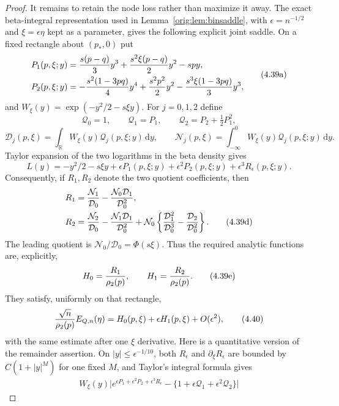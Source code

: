 \documentclass[11pt,a4paper]{article}
\numberwithin{equation}{section}
\theoremstyle{definition}
\theoremstyle{remark}
\newcommand{\dd}{\,\mathrm d}
\begin{document}
\begin{proof}
It remains to retain the node loss rather than maximize it away.  The
exact beta-integral representation used in Lemma~\ref{orig:lem:binsaddle}, with
$\epsilon=n^{-1/2}$ and $\xi=\epsilon\eta$ kept as a parameter, gives the
following explicit joint saddle.  On a fixed rectangle about $(p_*,0)$ put
\[
 \begin{aligned}
 P_1(p,\xi;y)&={s(p-q)\over3}y^3
       +{s^2\xi(p-q)\over2}y^2-spy,\\
 P_2(p,\xi;y)&=-{s^2(1-3pq)\over4}y^4+{s^2p^2\over2}y^2
       -{s^3\xi(1-3pq)\over3}y^3,
 \end{aligned}                                                   \tag{4.39a}
\]
and $W_\xi(y)=\exp(-y^2/2-s\xi y)$.  For $j=0,1,2$ define
\[
 \mathcal Q_0=1,\qquad \mathcal Q_1=P_1,\qquad
 \mathcal Q_2=P_2+\tfrac12P_1^2,
\]
\[
 \mathcal D_j(p,\xi)=\int_{\mathbb R}W_\xi(y)\mathcal Q_j(p,\xi;y)\dd y,
 \qquad
 \mathcal N_j(p,\xi)=\int_{-\infty}^0W_\xi(y)\mathcal Q_j(p,\xi;y)\dd y.  \tag{4.39b}
\]
Taylor expansion of the two logarithms in the beta density gives
\[
 L(y)=-y^2/2-s\xi y+\epsilon P_1(p,\xi;y)
       +\epsilon^2P_2(p,\xi;y)+\epsilon^3R_\epsilon(p,\xi;y).     \tag{4.39c}
\]
Consequently, if $R_1,R_2$ denote the two quotient coefficients, then
\begin{align}
 R_1={}&{\mathcal N_1\over\mathcal D_0}
       -{\mathcal N_0\mathcal D_1\over\mathcal D_0^2},\notag\\
 R_2={}&{\mathcal N_2\over\mathcal D_0}
       -{\mathcal N_1\mathcal D_1\over\mathcal D_0^2}
       +\mathcal N_0\left\{{\mathcal D_1^2\over\mathcal D_0^3}
                    -{\mathcal D_2\over\mathcal D_0^2}\right\}. \tag{4.39d}
\end{align}
The leading quotient is
$\mathcal N_0/\mathcal D_0=\Phi(s\xi)$.  Thus the required analytic
functions are, explicitly,
\[
                         H_0={R_1\over\rho_2(p)},\qquad
                         H_1={R_2\over\rho_2(p)}.                  \tag{4.39e}
\]
They satisfy, uniformly on that rectangle,
\[
 {\sqrt n\over\rho_2(p)}E_{Q,n}(\eta)
 =H_0(p,\xi)+\epsilon H_1(p,\xi)+O(\epsilon^2),        \tag{4.40}
\]
with the same estimate after one $\xi$ derivative.  Here is a quantitative
version of the remainder assertion.  On
$|y|\le\epsilon^{-1/10}$, both $R_\epsilon$ and
$\partial_\xi R_\epsilon$ are bounded by $C(1+|y|^M)$ for one fixed
$M$, and Taylor's integral formula gives
\begin{align}
 W_\xi(y)\big|e^{\epsilon P_1+\epsilon^2P_2+\epsilon^3R_\epsilon}
       -\{1+\epsilon\mathcal Q_1+\epsilon^2\mathcal Q_2\}\big|

\end{align}
\end{proof}
\end{document}
